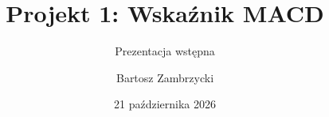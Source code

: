 \documentclass[t,aspectratio=169,11pt]{beamer}
\title{Projekt 1: Wskaźnik MACD}
\subtitle{Prezentacja wstępna}
\author{Bartosz Zambrzycki}
\institute{Metody numeryczne}
\date{21 października 2026}
\begin{document}
\begin{frame}[c]
  \titlepage
\end{frame}





\end{document}
